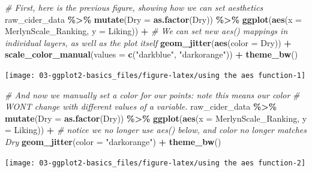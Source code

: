 \documentclass[
]{book}
\newenvironment{Shaded}{\begin{snugshade}}{\end{snugshade}}
\newcommand{\AttributeTok}[1]{\textcolor[rgb]{0.13,0.29,0.53}{#1}}
\newcommand{\CommentTok}[1]{\textcolor[rgb]{0.56,0.35,0.01}{\textit{#1}}}
\newcommand{\FunctionTok}[1]{\textcolor[rgb]{0.13,0.29,0.53}{\textbf{#1}}}
\newcommand{\NormalTok}[1]{#1}
\newcommand{\SpecialCharTok}[1]{\textcolor[rgb]{0.81,0.36,0.00}{\textbf{#1}}}
\newcommand{\StringTok}[1]{\textcolor[rgb]{0.31,0.60,0.02}{#1}}
\begin{document}
\begin{Shaded}
\begin{Highlighting}[]
\CommentTok{\# First, here is the previous figure, showing how we can set aesthetics}
\NormalTok{raw\_cider\_data }\SpecialCharTok{\%\textgreater{}\%}
  \FunctionTok{mutate}\NormalTok{(}\AttributeTok{Dry =} \FunctionTok{as.factor}\NormalTok{(Dry)) }\SpecialCharTok{\%\textgreater{}\%}
  \FunctionTok{ggplot}\NormalTok{(}\FunctionTok{aes}\NormalTok{(}\AttributeTok{x =}\NormalTok{ MerlynScale\_Ranking, }\AttributeTok{y =}\NormalTok{ Liking)) }\SpecialCharTok{+} 
  \CommentTok{\# We can set new aes() mappings in individual layers, as well as the plot itself}
  \FunctionTok{geom\_jitter}\NormalTok{(}\FunctionTok{aes}\NormalTok{(}\AttributeTok{color =}\NormalTok{ Dry)) }\SpecialCharTok{+} 
  \FunctionTok{scale\_color\_manual}\NormalTok{(}\AttributeTok{values =} \FunctionTok{c}\NormalTok{(}\StringTok{"darkblue"}\NormalTok{, }\StringTok{"darkorange"}\NormalTok{)) }\SpecialCharTok{+}
  \FunctionTok{theme\_bw}\NormalTok{()}
\end{Highlighting}
\end{Shaded}

\begin{center}\texttt{[image: 03-ggplot2-basics\_files/figure-latex/using the aes function-1]} \end{center}

\begin{Shaded}
\begin{Highlighting}[]
\CommentTok{\# And now we manually set a color for our points: note this means our color}
\CommentTok{\# WON\textquotesingle{}T change with different values of a variable.}
\NormalTok{raw\_cider\_data }\SpecialCharTok{\%\textgreater{}\%}
  \FunctionTok{mutate}\NormalTok{(}\AttributeTok{Dry =} \FunctionTok{as.factor}\NormalTok{(Dry)) }\SpecialCharTok{\%\textgreater{}\%}
  \FunctionTok{ggplot}\NormalTok{(}\FunctionTok{aes}\NormalTok{(}\AttributeTok{x =}\NormalTok{ MerlynScale\_Ranking, }\AttributeTok{y =}\NormalTok{ Liking)) }\SpecialCharTok{+} 
  \CommentTok{\# notice we no longer use aes() below, and color no longer matches \textasciigrave{}Dry\textasciigrave{}}
  \FunctionTok{geom\_jitter}\NormalTok{(}\AttributeTok{color =} \StringTok{"darkorange"}\NormalTok{) }\SpecialCharTok{+} 
  \FunctionTok{theme\_bw}\NormalTok{()}
\end{Highlighting}
\end{Shaded}

\begin{center}\texttt{[image: 03-ggplot2-basics\_files/figure-latex/using the aes function-2]} \end{center}
\end{document}
